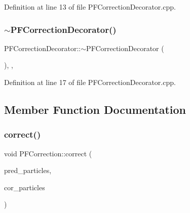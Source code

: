 Definition at line 13 of file P\+F\+Correction\+Decorator.\+cpp.

\mbox{\label{classbfl_1_1PFCorrectionDecorator_a2662b107e2199b27f84ff4da9e188915}} 
\subsubsection{\texorpdfstring{$\sim$\+P\+F\+Correction\+Decorator()}{~PFCorrectionDecorator()}}
{\footnotesize\ttfamily P\+F\+Correction\+Decorator\+::$\sim$\+P\+F\+Correction\+Decorator (\begin{DoxyParamCaption}{ }\end{DoxyParamCaption})\hspace{0.3cm}{\ttfamily [protected]}, {\ttfamily [virtual]}, {\ttfamily [noexcept]}}



Definition at line 17 of file P\+F\+Correction\+Decorator.\+cpp.



\subsection{Member Function Documentation}
\mbox{\label{classbfl_1_1PFCorrection_a560666b2e7566a846cb4ce4684e195e0}} 
\subsubsection{\texorpdfstring{correct()}{correct()}}
{\footnotesize\ttfamily void P\+F\+Correction\+::correct (\begin{DoxyParamCaption}\item[{const \mbox{\hyperlink{classbfl_1_1ParticleSet}{bfl\+::\+Particle\+Set}} \&}]{pred\+\_\+particles,  }\item[{\mbox{\hyperlink{classbfl_1_1ParticleSet}{bfl\+::\+Particle\+Set}} \&}]{cor\+\_\+particles }\end{DoxyParamCaption})\hspace{0.3cm}{\ttfamily [inherited]}}



